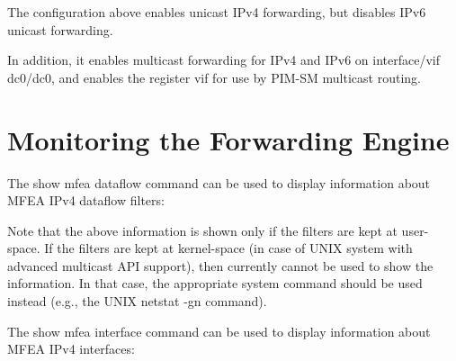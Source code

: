 \vspace{0.1in}
The configuration above enables unicast IPv4 forwarding, but disables
IPv6 unicast forwarding.

In addition, it enables multicast forwarding for IPv4 and IPv6 on
interface/vif {\stt dc0/dc0}, and enables the register vif for use by
PIM-SM multicast routing.

\section{Monitoring the Forwarding Engine}

The {\stt show mfea dataflow} command can be used to display
information about MFEA IPv4 dataflow filters:

\vspace{0.1in}
\noindent{}
\vspace{0.1in}

Note that the above information is shown only if the filters are kept at
user-space. If the filters are kept at kernel-space (\eg in case of UNIX
system with advanced multicast API support), then currently \xorpsh
cannot be used to show the information. In that case, the appropriate system
command should be used instead (e.g., the UNIX {\stt netstat -gn} command).

The {\stt show mfea interface} command can be used to display
information about MFEA IPv4 interfaces:

